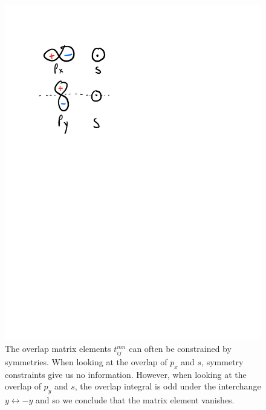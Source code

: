 \begin{figure}[htbp]
    \centering
    \includegraphics[scale=0.5]{Images/fig-orbitaloverlapsymmetries.pdf}
    
    \caption{The overlap matrix elements $t_{ij}^{mn}$ can often be constrained by symmetries. When looking at the overlap of $p_x$ and $s$, symmetry constraints give us no information. However, when looking at the overlap of $p_y$ and $s$, the overlap integral is odd under the interchange $y \leftrightarrow -y$ and so we conclude that the matrix element vanishes.}
    \label{fig-orbitaloverlapsymmetries}
\end{figure}


